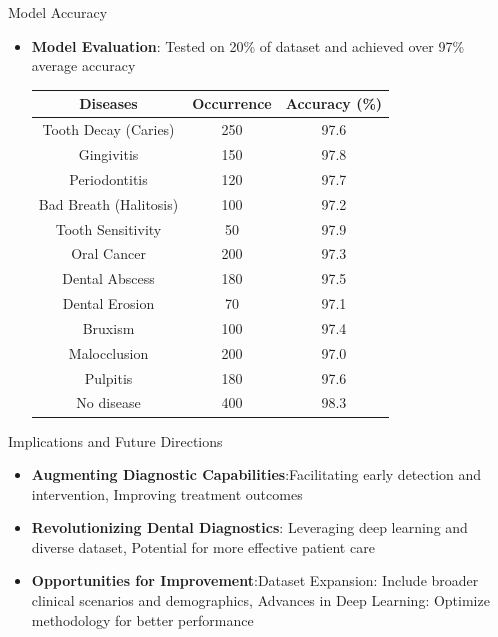 \documentclass{beamer}
\begin{document}
\begin{frame}{Model Accuracy}
	\begin{itemize}
		\vfill
		\item \textbf{Model Evaluation}: Tested on 20\% of dataset and achieved over 97\% average accuracy
		\begin{table}[h]
			\centering
			\begin{tabular}{|c|c|c|}
				\hline
				\textbf{Diseases}      & \textbf{Occurrence} & \textbf{Accuracy (\%)} \\
				\hline
				Tooth Decay (Caries)   & 250                 & 97.6                   \\
				Gingivitis             & 150                 & 97.8                   \\
				Periodontitis          & 120                 & 97.7                   \\
				Bad Breath (Halitosis) & 100                 & 97.2                   \\
				Tooth Sensitivity      & 50                  & 97.9                   \\
				Oral Cancer            & 200                 & 97.3                   \\
				Dental Abscess         & 180                 & 97.5                   \\
				Dental Erosion         & 70                  & 97.1                   \\
				Bruxism                & 100                 & 97.4                   \\
				Malocclusion           & 200                 & 97.0                   \\
				Pulpitis               & 180                 & 97.6                   \\
				No disease             & 400                 & 98.3                   \\
				\hline
			\end{tabular}
		\end{table}
	\end{itemize}
\end{frame}

\begin{frame}{Implications and Future Directions}
	\begin{itemize}
		\vfill
		\item \textbf{Augmenting Diagnostic Capabilities}:Facilitating early detection and intervention, Improving treatment outcomes
		\vfill
		\item \textbf{Revolutionizing Dental Diagnostics}: Leveraging deep learning and diverse dataset, Potential for more effective patient care
		\vfill
		\item \textbf{Opportunities for Improvement}:Dataset Expansion: Include broader clinical scenarios and demographics, Advances in Deep Learning: Optimize methodology for better performance
		
	\end{itemize}
\end{frame}
\end{document}
